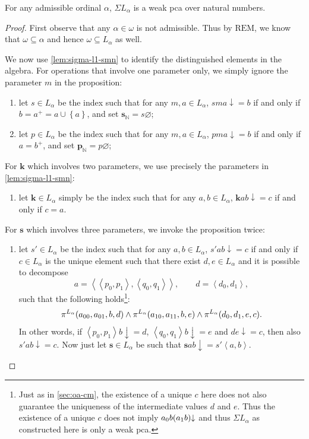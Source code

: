 \documentclass[12pt,openany]{book}
\theoremstyle{plain}
\theoremstyle{definition}
\newcommand\uplabel[1]{\textup{(#1)}}
\newcommand\tuple[1]{\left\langle #1 \right\rangle}
\newcommand\REM{\mathrm{REM}}
\newcommand\bk{\mathbf{k}}
\newcommand\bs{\mathbf{s}}
\newcommand\bsN{\mathbf{s}_\mathbb{N}}
\newcommand\bpN{\mathbf{p}_\mathbb{N}}
\begin{document}
\begin{corollary}
  \label{cor:sigma-l1-pca}
  For any admissible ordinal $\alpha$, $\Sigma L_\alpha$ is a weak pca over natural numbers.
\end{corollary}

\begin{proof}
  First observe that any $\alpha \in \omega$ is not admissible. Thus by $\REM$, we know that $\omega \subseteq \alpha$ and hence $\omega \subseteq L_\alpha$ as well.

  We now use \autoref{lem:sigma-l1-smn} to identify the distinguished elements in the algebra. For operations that involve one parameter only, we simply ignore the parameter $m$ in the proposition:
  \begin{enumerate}[label=\uplabel{\roman*}]
    \item let $s \in L_\alpha$ be the index such that for any $m, a \in L_\alpha$, $sma {\downarrow} = b$ if and only if $b = a^+ = a \cup \left\{a\right\}$, and set $\bsN = s \varnothing$;
    \item let $p \in L_\alpha$ be the index such that for any $m, a \in L_\alpha$, $pma {\downarrow} = b$ if and only if $a = b^+$, and set $\bpN = p \varnothing$;
  \end{enumerate}

  For $\bk$ which involves two parameters, we use precisely the parameters in \autoref{lem:sigma-l1-smn}:
  \begin{enumerate}[label=\uplabel{\roman*},resume]
    \item let $\bk \in L_\alpha$ simply be the index such that for any $a, b \in L_\alpha$, $\bk ab {\downarrow} = c$ if and only if $c = a$.
  \end{enumerate}

  For $\bs$ which involves three parameters, we invoke the proposition twice:
  \begin{enumerate}[label=\uplabel{\roman*},resume]
    \item let $s' \in L_\alpha$ be the index such that for any $a, b \in L_\alpha$, $s' ab {\downarrow} = c$ if and only if $c \in L_\alpha$ is the unique element such that there exist $d, e \in L_\alpha$ and it is possible to decompose
          \[a = \tuple{\tuple{p_0, p_1}, \tuple{q_0, q_1}}, \qquad d = \tuple{d_0, d_1},\]
          such that the following holds\footnote{Just as in \autoref{sec:oa-cm}, the existence of a unique $c$ here does not also guarantee the uniqueness of the intermediate values $d$ and $e$. Thus the existence of a unique $c$ does not imply $a_0 b \mleft(a_1 b\mright) {\downarrow}$ and thus $\Sigma L_\alpha$ as constructed here is only a weak pca.}:
          \[\pi^{L_\alpha}\mleft(a_{00}, a_{01}, b, d\mright) \land \pi^{L_\alpha}\mleft(a_{10}, a_{11}, b, e\mright) \land \pi^{L_\alpha}\mleft(d_0, d_1, e, c\mright).\]
          In other words, if $\tuple{p_0, p_1} b {\downarrow} = d$, $\tuple{q_0, q_1} b {\downarrow} = e$ and $de {\downarrow} = c$, then also $s' ab {\downarrow} = c$. Now just let $\bs \in L_\alpha$ be such that $\bs ab {\downarrow} = s' \tuple{a, b}$.
  \end{enumerate}


\end{proof}
\end{document}
